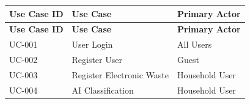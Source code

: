 \begin{longtable}{|p{2.5cm}|p{6cm}|p{4cm}|}

\hline

\textbf{Use Case ID}

&

\textbf{Use Case}

&

\textbf{Primary Actor}

\\

\hline

\endfirsthead

\hline

\textbf{Use Case ID}

&

\textbf{Use Case}

&

\textbf{Primary Actor}

\\

\hline

\endhead

UC-001

&

User Login

&

All Users

\\

\hline

UC-002

&

Register User

&

Guest

\\

\hline

UC-003

&

Register Electronic Waste

&

Household User

\\

\hline

UC-004

&

AI Classification

&

Household User

\\

\hline


\end{longtable}
